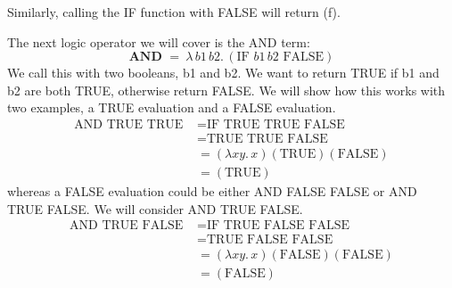 \documentclass[12pt]{article}
\begin{document}
\begin{enumerate}
Similarly, calling the IF function with FALSE will return (f). 
\par The next logic operator we will cover is the AND term: $$\textbf{AND } =\  \lambda\, b1\, b2.\, (\text{IF }b1\, b2\text{ FALSE})$$
We call this with two booleans, b1 and b2. We want to return TRUE if b1 and b2 are both TRUE, otherwise return FALSE. We will show how this works with two examples, a TRUE evaluation and a FALSE evaluation.
\begin{align*}
\text{AND TRUE TRUE } &= \text{IF TRUE TRUE FALSE}\\
&= \text{TRUE TRUE FALSE}\\
&= (\lambda xy.\, x)(\text{TRUE})(\text{FALSE})\\
&= (\text{TRUE})
\end{align*}
whereas a FALSE evaluation could be either AND FALSE FALSE or AND TRUE FALSE. We will consider AND TRUE FALSE.
\begin{align*}
\text{AND TRUE FALSE } &= \text{IF TRUE FALSE FALSE} \\
&= \text{TRUE FALSE FALSE}\\
&= (\lambda xy.\, x)(\text{FALSE})(\text{FALSE})\\
&= (\text{FALSE})
\end{align*}


\end{enumerate}
\end{document}
